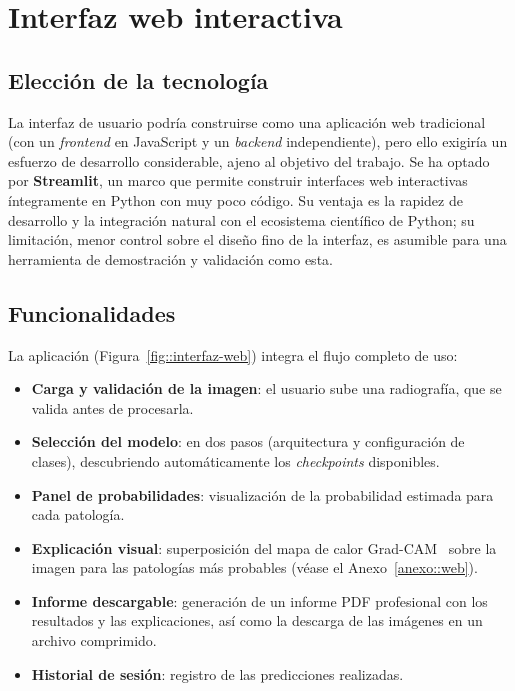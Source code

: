\section{Interfaz web interactiva}
\label{sec::dep_web}

\subsection{Elección de la tecnología}

La interfaz de usuario podría construirse como una aplicación web tradicional
(con un \textit{frontend} en JavaScript y un \textit{backend} independiente), pero
ello exigiría un esfuerzo de desarrollo considerable, ajeno al objetivo del
trabajo. Se ha optado por \textbf{Streamlit}, un marco que permite construir
interfaces web interactivas íntegramente en Python con muy poco código. Su ventaja
es la rapidez de desarrollo y la integración natural con el ecosistema científico
de Python; su limitación, menor control sobre el diseño fino de la interfaz, es
asumible para una herramienta de demostración y validación como esta.

\subsection{Funcionalidades}

La aplicación (Figura~\ref{fig::interfaz-web}) integra el flujo completo de uso:

\begin{itemize}
  \item \textbf{Carga y validación de la imagen}: el usuario sube una radiografía,
        que se valida antes de procesarla.
  \item \textbf{Selección del modelo}: en dos pasos (arquitectura y configuración de
        clases), descubriendo automáticamente los \textit{checkpoints} disponibles.
  \item \textbf{Panel de probabilidades}: visualización de la probabilidad estimada
        para cada patología.
  \item \textbf{Explicación visual}: superposición del mapa de calor
        Grad-CAM~\cite{selvarajuGradCAMVisualExplanations2017} sobre la imagen para
        las patologías más probables (véase el Anexo~\ref{anexo::web}).
  \item \textbf{Informe descargable}: generación de un informe PDF profesional con
        los resultados y las explicaciones, así como la descarga de las imágenes en
        un archivo comprimido.
  \item \textbf{Historial de sesión}: registro de las predicciones realizadas.
\end{itemize}

